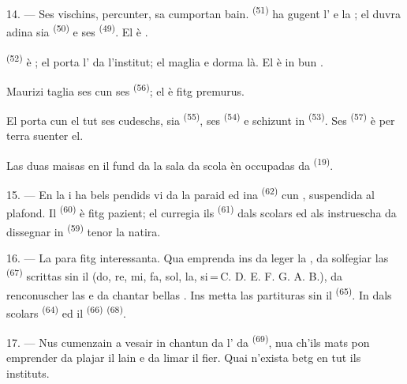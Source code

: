 14. --- Ses vischins, percunter, sa cumportan bain. 
\textsuperscript{(51)} ha gugent l' e la ; el
duvra adina sia  \textsuperscript{(50)} e ses 
\textsuperscript{(49)}. El è .

 \textsuperscript{(52)} è ; el porta
l' da l'institut; el maglia e dorma là. El è in bun
.

Maurizi taglia ses  cun ses 
\textsuperscript{(56)}; el è fitg premurus.

El porta cun el tut ses cudeschs, sia  \textsuperscript{(55)},
ses  \textsuperscript{(54)} e schizunt in
 \textsuperscript{(53)}. Ses 
\textsuperscript{(57)} è per terra suenter el.

Las duas maisas en il fund da la sala da scola èn occupadas da  \textsuperscript{(19)}.

\VUsaut{4.6mm}
\VUsaut{3.4mm}

15. --- En la  i ha bels  pendids vi da la
paraid ed ina  \textsuperscript{(62)} cun ,
suspendida al plafond. Il  \textsuperscript{(60)} è fitg pazient;
el curregia ils  \textsuperscript{(61)} dals scolars ed als
instruescha da dissegnar in  \textsuperscript{(59)} tenor la natira.

16. --- La  para fitg interessanta. Qua emprenda ins da
leger la , da solfegiar las 
\textsuperscript{(67)} scrittas sin il  (do, re, mi, fa,
sol, la, si\,=\,C. D. E. F. G. A. B.), da renconuscher las  e da
chantar bellas . Ins metta las partituras sin il 
\textsuperscript{(65)}. In dals scolars 
\textsuperscript{(64)} ed il  \textsuperscript{(66)}
 \textsuperscript{(68)}.

17. --- Nus cumenzain a vesair in chantun da l' da  \textsuperscript{(69)}, nua ch'ils mats pon emprender da plajar il lain e
da limar il fier. Quai n'exista betg en tut ils instituts.

